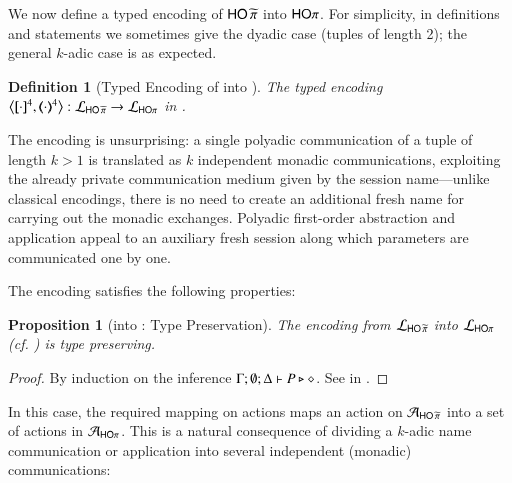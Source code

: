 \documentclass[preprint,11pt]{elsarticle}
\newtheorem{definition}{Definition}[section]
\newtheorem{proposition}{Proposition}[section]
\begin{document}
{We now define a typed encoding of 
$\mathsf{HO}\,{\widetilde{\pi}}$ into $\mathsf{HO}\pi$. For simplicity, in definitions and statements we sometimes give the dyadic case (tuples of length 2);
the general $k$-adic case is as expected.

\begin{definition}[Typed Encoding of \PHOp into \HOp]
\label{d:enc:phoptohop}
The typed encoding
	$\enco{\pmap{\cdot}{4}, \tmap{\cdot}{4}}: \tyl{L}_{\PHOp} \to \tyl{L}_{\HOp}$ 
in .
\end{definition}

The encoding is unsurprising: a single polyadic communication of a tuple of length $k > 1$
is translated as $k$ independent monadic communications, exploiting the already private communication medium given by the session name---unlike classical encodings, there is no need to create an additional fresh name for carrying out the monadic exchanges.
Polyadic first-order abstraction and application appeal to an auxiliary fresh session along which   parameters are communicated one by one.

The encoding satisfies the following properties:


{
\begin{proposition}[\PHOp into \HOp: Type Preservation]
\label{prop:typepres_pHOp_to_HOp}
The encoding from
		$\mathcal{L}_{\mathsf{HO}\,{\widetilde{\pi}}}$ into $\mathcal{L}_{\mathsf{HO}\pi}$ (cf. )
is type preserving.
\end{proposition}}

\begin{proof}
	By induction on the inference $\Gamma; \emptyset; \Delta \vdash P \triangleright \diamond$.
	See  in .
	\end{proof}
	
In this case, the required mapping on actions 
maps an action on $\mathcal{A}_{\mathsf{HO}\,{\widetilde{\pi}}}$ into a set of actions in $\mathcal{A}_{\mathsf{HO}\pi}$.
This is a natural consequence of dividing a $k$-adic name communication or application into several
independent (monadic) communications:

}
\end{document}
